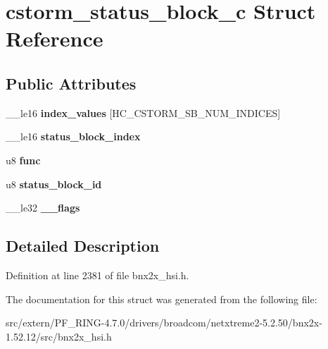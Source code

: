 \hypertarget{structcstorm__status__block__c}{
\section{cstorm\_\-status\_\-block\_\-c Struct Reference}
\label{structcstorm__status__block__c}
}
\subsection*{Public Attributes}
\begin{DoxyCompactItemize}
\item 
\hypertarget{structcstorm__status__block__c_afacb9c55af93fadbcc2a3cb5782427cd}{
\_\-\_\-le16 {\bfseries index\_\-values} \mbox{[}HC\_\-CSTORM\_\-SB\_\-NUM\_\-INDICES\mbox{]}}
\label{structcstorm__status__block__c_afacb9c55af93fadbcc2a3cb5782427cd}

\item 
\hypertarget{structcstorm__status__block__c_aaec67ac15f6af6ed8c843ab9eab8206f}{
\_\-\_\-le16 {\bfseries status\_\-block\_\-index}}
\label{structcstorm__status__block__c_aaec67ac15f6af6ed8c843ab9eab8206f}

\item 
\hypertarget{structcstorm__status__block__c_ab21831534eedae025fc741aefae764ab}{
u8 {\bfseries func}}
\label{structcstorm__status__block__c_ab21831534eedae025fc741aefae764ab}

\item 
\hypertarget{structcstorm__status__block__c_ae466a9130fbaf3acb52ec0ff9c5dfef2}{
u8 {\bfseries status\_\-block\_\-id}}
\label{structcstorm__status__block__c_ae466a9130fbaf3acb52ec0ff9c5dfef2}

\item 
\hypertarget{structcstorm__status__block__c_a520d9372bdebb00437fac63f362a2289}{
\_\-\_\-le32 {\bfseries \_\-\_\-flags}}
\label{structcstorm__status__block__c_a520d9372bdebb00437fac63f362a2289}

\end{DoxyCompactItemize}


\subsection{Detailed Description}


Definition at line 2381 of file bnx2x\_\-hsi.h.



The documentation for this struct was generated from the following file:\begin{DoxyCompactItemize}
\item 
src/extern/PF\_\-RING-\/4.7.0/drivers/broadcom/netxtreme2-\/5.2.50/bnx2x-\/1.52.12/src/bnx2x\_\-hsi.h\end{DoxyCompactItemize}
